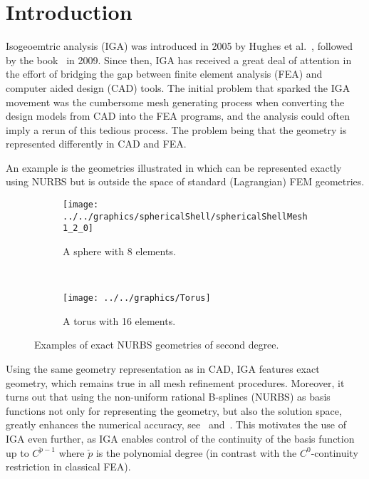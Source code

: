 \section{Introduction}
Isogeoemtric analysis (IGA) was introduced in 2005 by Hughes et al.~\cite{Hughes2005iac}, followed by the book~\cite{Cottrell2009iat} in 2009. Since then, IGA has received a great deal of attention in the effort of bridging the gap between finite element analysis (FEA) and computer aided design (CAD) tools. The initial problem that sparked the IGA movement was the cumbersome mesh generating process when converting the design models from CAD into the FEA programs, and the analysis could often imply a rerun of this tedious process. The problem being that the geometry is represented differently in CAD and FEA. 

An example is the geometries illustrated in  which can be represented exactly using NURBS but is outside the space of standard (Lagrangian) FEM geometries.
\begin{figure}
	\centering
	\begin{subfigure}[b]{0.3\textwidth}
		\centering
		\texttt{[image: ../../graphics/sphericalShell/sphericalShellMesh1\_2\_0]}
		\caption{A sphere with 8 elements.}
		\label{Fig3:sphere}
	\end{subfigure}
	~    
	\begin{subfigure}[b]{0.35\textwidth}
		\centering
		\texttt{[image: ../../graphics/Torus]}
		\caption{A torus with 16 elements.}
		\label{Fig3:Torus}
	\end{subfigure}
	\caption{Examples of exact NURBS geometries of second degree.}
	\label{Fig3:NURBSexamples}
\end{figure} 
Using the same geometry representation as in CAD, IGA features exact geometry, which remains true in all mesh refinement procedures. Moreover, it turns out that using the non-uniform rational B-splines (NURBS) as basis functions not only for representing the geometry, but also the solution space, greatly enhances the numerical accuracy, see~\cite{BeiraodaVeiga2011sef} and~\cite{BeiraodaVeiga2014mao}. This motivates the use of IGA even further, as IGA enables control of the continuity of the basis function up to $C^{\check{p}-1}$ where $\check{p}$ is the polynomial degree (in contrast with the $C^0$-continuity restriction in classical FEA). 

